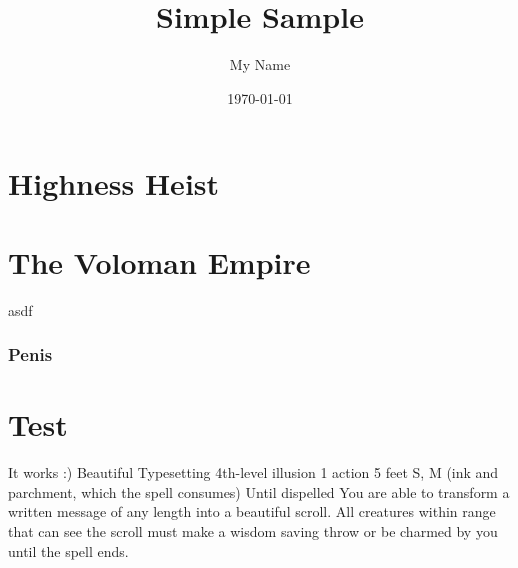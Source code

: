 \documentclass{memoir}
\title{Simple Sample} %
\author{My Name} %
\date{\today} %
\begin{document}
\tableofcontents

\chapter{Highness Heist}

\lipsum

\chapter{The Voloman Empire}

asdf

\subsection{Penis}
\lipsum

\chapter{Test}
It works :)
\RPGSpellHeader
  {Beautiful Typesetting}
  {4th-level illusion}
  {1 action}
  {5 feet}
  {S, M (ink and parchment, which the spell consumes)}
  {Until dispelled}
You are able to transform a written message of any length into a beautiful scroll. All creatures within range that can see the scroll must make a wisdom saving throw or be charmed by you until the spell ends.
\end{document}
